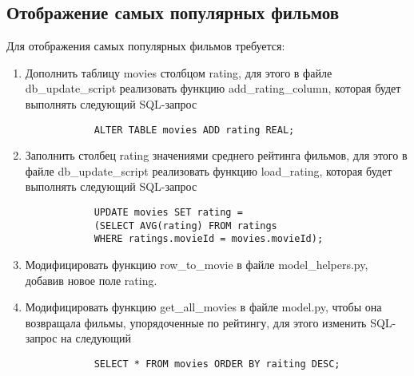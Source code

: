 \documentclass[a4paper,12pt]{report} %
\begin{document}
    \subsection{Отображение самых популярных фильмов}
    Для отображения самых популярных фильмов требуется:
    \begin{enumerate}
    	\item Дополнить таблицу movies столбцом rating, для этого в файле db\_update\_script реализовать функцию add\_rating\_column, которая будет выполнять следующий SQL-запрос 
    	\begin{verbatim}
    		ALTER TABLE movies ADD rating REAL;
    	\end{verbatim}
        \item Заполнить столбец rating значениями среднего рейтинга фильмов, для этого в файле db\_update\_script реализовать функцию load\_rating, которая будет выполнять следующий SQL-запрос
        \begin{verbatim}
        	UPDATE movies SET rating = 
        	(SELECT AVG(rating) FROM ratings
        	WHERE ratings.movieId = movies.movieId);
        \end{verbatim}
        \item Модифицировать функцию row\_to\_movie в файле model\_helpers.py, добавив новое поле rating.
    	\item Модифицировать функцию get\_all\_movies в файле model.py, чтобы она возвращала фильмы, упорядоченные по рейтингу, для этого изменить SQL-запрос на следующий
    	\begin{verbatim}
    		SELECT * FROM movies ORDER BY raiting DESC;
    	\end{verbatim}
    \end{enumerate}
    
    
	
\end{document}
